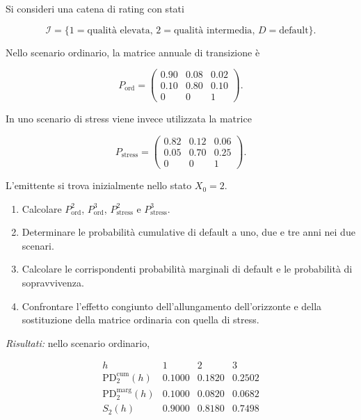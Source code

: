 \begin{exercise}

\label{ex:cap09-orizzonte-stress}

Si consideri una catena di rating con stati

\[
\mathcal{I}
=
\{
1=\text{qualit\`{a} elevata},
\,
2=\text{qualit\`{a} intermedia},
\,
D=\text{default}
\}.
\]

Nello scenario ordinario, la matrice annuale di transizione \`{e}

\[
P_{\mathrm{ord}}
=
\begin{pmatrix}
0.90&0.08&0.02\\
0.10&0.80&0.10\\
0&0&1
\end{pmatrix}.
\]

In uno scenario di stress viene invece utilizzata la matrice

\[
P_{\mathrm{stress}}
=
\begin{pmatrix}
0.82&0.12&0.06\\
0.05&0.70&0.25\\
0&0&1
\end{pmatrix}.
\]

L'emittente si trova inizialmente nello stato $X_0=2$.

\begin{enumerate}

\item Calcolare $P_{\mathrm{ord}}^2$, $P_{\mathrm{ord}}^3$,
$P_{\mathrm{stress}}^2$ e $P_{\mathrm{stress}}^3$.

\item Determinare le probabilit\`{a} cumulative di default a uno, due
e tre anni nei due scenari.

\item Calcolare le corrispondenti probabilit\`{a} marginali di default
e le probabilit\`{a} di sopravvivenza.

\item Confrontare l'effetto congiunto dell'allungamento dell'orizzonte
e della sostituzione della matrice ordinaria con quella di stress.

\end{enumerate}

\textit{Risultati:} nello scenario ordinario,

\[
\begin{array}{c|ccc}
h
&
1
&
2
&
3
\\
\hline
\mathrm{PD}^{\mathrm{cum}}_2(h)
&
0.1000
&
0.1820
&
0.2502
\\
\mathrm{PD}^{\mathrm{marg}}_2(h)
&
0.1000
&
0.0820
&
0.0682
\\
S_2(h)
&
0.9000
&
0.8180
&
0.7498
\end{array}
\]


\end{exercise}
